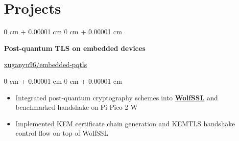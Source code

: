 \documentclass[10pt, letterpaper]{article}
\newenvironment{highlights}{
    \begin{itemize}[
        topsep=0.10 cm,
        parsep=0.10 cm,
        partopsep=0pt,
        itemsep=0pt,
        leftmargin=0 cm + 10pt
    ]
}{
    \end{itemize}
} %
\newenvironment{onecolentry}{
    \begin{adjustwidth}{
        0 cm + 0.00001 cm
    }{
        0 cm + 0.00001 cm
    }
}{
    \end{adjustwidth}
} %
\newenvironment{twocolentry}[2][]{
    \onecolentry
    \def\secondColumn{#2}
    \setcolumnwidth{\fill, 4.5 cm}
    \begin{paracol}{2}
}{
    \switchcolumn \raggedleft \secondColumn
    \end{paracol}
    \endonecolentry
} %
\begin{document}


    
    \section{Projects}
        \begin{twocolentry}
            {\href{https://github.com/xuganyu96/embedded-pqtls}{xuganyu96/embedded-pqtls}}
            {\bf Post-quantum TLS on embedded devices}
        \end{twocolentry}
        \vspace{0.1cm}
        \begin{onecolentry}
            \begin{highlights}
                \item Integrated post-quantum cryptography schemes into \href{https://github.com/xuganyu96/wolfssl}{\bf WolfSSL} and benchmarked handshake on Pi Pico 2 W
                \item Implemented KEM certificate chain generation and KEMTLS handshake control flow on top of WolfSSL
            \end{highlights}
        \end{onecolentry}
        \vspace{0.3cm}
\end{document}
